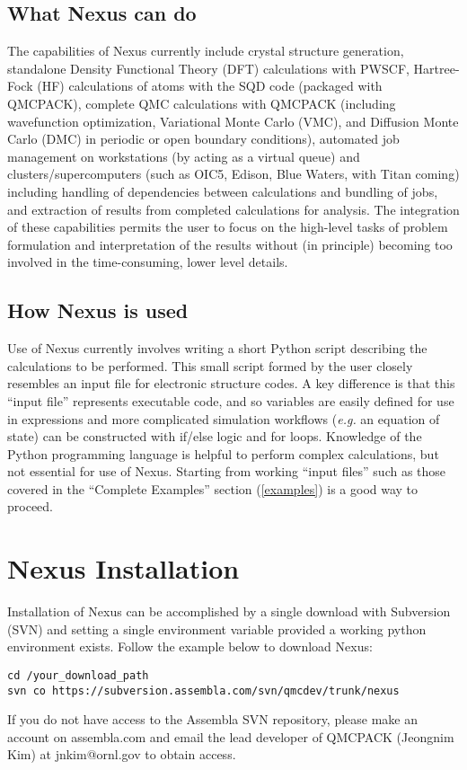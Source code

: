 \documentclass[oneside,11pt]{memoir}
\numberwithin{equation}{section}
\begin{document}
\section{What Nexus can do}
The capabilities of Nexus currently include crystal structure 
generation, standalone Density Functional Theory (DFT) calculations with PWSCF, 
Hartree-Fock (HF) calculations of atoms with the SQD code (packaged with 
QMCPACK), complete QMC calculations with QMCPACK (including wavefunction 
optimization, Variational Monte Carlo (VMC), and Diffusion Monte Carlo (DMC) in 
periodic or open boundary conditions), automated job management on workstations 
(by acting as a virtual queue) and clusters/supercomputers (such as OIC5, 
Edison, Blue Waters, with Titan coming) including handling of dependencies 
between calculations and bundling of jobs,  and extraction of results from 
completed calculations for analysis.  The integration of these capabilities 
permits the user to focus on the high-level tasks of problem formulation and 
interpretation of the results without (in principle) becoming too involved 
in the time-consuming, lower level details.

\section{How Nexus is used}
Use of Nexus currently involves writing a short Python script 
describing the calculations to be performed.  This small script formed by the 
user closely resembles an input file for electronic structure codes.  A key 
difference is that this ``input file'' represents executable code, and so 
variables are easily defined for use in expressions and more complicated 
simulation workflows (\emph{e.g.} an equation of state) can be constructed 
with if/else logic and for loops.  Knowledge of the Python programming language 
is helpful to perform complex calculations, but not essential for use of  
Nexus.  Starting from working ``input files'' such as those covered 
in the ``Complete Examples'' section (\ref{examples}) is a good way to proceed. 


\pagebreak
\chapter{Nexus Installation} \label{installation}
Installation of Nexus can be accomplished by a single download 
with Subversion (SVN) and setting a single environment variable provided a 
working python environment exists. Follow the example below to download  
Nexus:
\begin{shaded}
\begin{verbatim}
cd /your_download_path
svn co https://subversion.assembla.com/svn/qmcdev/trunk/nexus
\end{verbatim}
\end{shaded}
If you do not have access to the Assembla SVN repository, please make an 
account on assembla.com and email the lead developer of QMCPACK (Jeongnim Kim) 
at jnkim@ornl.gov to obtain access.
\end{document}
